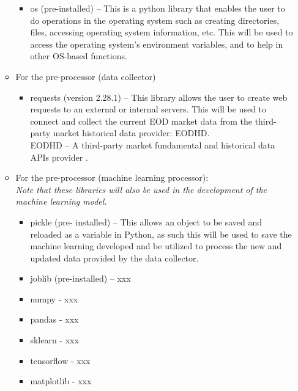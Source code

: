 \begin{itemize}
\begin{itemize}
\begin{itemize}
                    \item[\ding{109}] os (pre-installed) – This is a python library that enables 
                    the user to do operations in the operating system such as creating directories, 
                    files, accessing operating system information, etc. This will be used to access 
                    the operating system’s environment variables, and to help in other OS-based functions.
                \end{itemize}
            \item[\ding{108}] For the pre-processor (data collector)
                \begin{itemize}
                    \item[\ding{109}] requests (version 2.28.1) – This library allows the user to create web 
                    requests to an external or internal servers. This will be used to connect and collect 
                    the current EOD market data from the third-party market historical data provider: EODHD.
                    \\ EODHD – A third-party market fundamental and historical data APIs provider
                    \cite{EODHD}.
                \end{itemize}
            \item[\ding{108}] For the pre-processor (machine learning processor):
            \\ \textit{Note that these libraries will also be used in the development of the machine learning model.}
                \begin{itemize}
                    \item[\ding{109}] pickle (pre- installed) – This allows an object to be 
                    saved and reloaded as a variable in Python, as such this will be used to 
                    save the machine learning developed and be utilized to process the new and 
                    updated data provided by the data collector.
                    \item[\ding{109}] joblib (pre-installed) – xxx
                    \item[\ding{109}] numpy - xxx
                    \item[\ding{109}] pandas - xxx
                    \item[\ding{109}] sklearn - xxx
                    \item[\ding{109}] tensorflow - xxx
                    \item[\ding{109}] matplotlib - xxx

\end{itemize}
\end{itemize}
\end{itemize}
